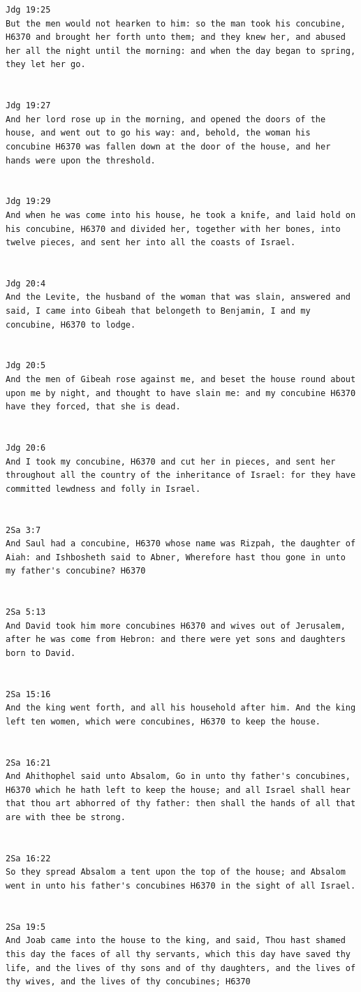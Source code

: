 \documentclass[11pt]{article}
\begin{document}
\begin{lstlisting}
Jdg 19:25
But the men would not hearken to him: so the man took his concubine, H6370 and brought her forth unto them; and they knew her, and abused her all the night until the morning: and when the day began to spring, they let her go.


Jdg 19:27
And her lord rose up in the morning, and opened the doors of the house, and went out to go his way: and, behold, the woman his concubine H6370 was fallen down at the door of the house, and her hands were upon the threshold.


Jdg 19:29
And when he was come into his house, he took a knife, and laid hold on his concubine, H6370 and divided her, together with her bones, into twelve pieces, and sent her into all the coasts of Israel.


Jdg 20:4
And the Levite, the husband of the woman that was slain, answered and said, I came into Gibeah that belongeth to Benjamin, I and my concubine, H6370 to lodge.


Jdg 20:5
And the men of Gibeah rose against me, and beset the house round about upon me by night, and thought to have slain me: and my concubine H6370 have they forced, that she is dead.


Jdg 20:6
And I took my concubine, H6370 and cut her in pieces, and sent her throughout all the country of the inheritance of Israel: for they have committed lewdness and folly in Israel.


2Sa 3:7
And Saul had a concubine, H6370 whose name was Rizpah, the daughter of Aiah: and Ishbosheth said to Abner, Wherefore hast thou gone in unto my father's concubine? H6370


2Sa 5:13
And David took him more concubines H6370 and wives out of Jerusalem, after he was come from Hebron: and there were yet sons and daughters born to David.


2Sa 15:16
And the king went forth, and all his household after him. And the king left ten women, which were concubines, H6370 to keep the house.


2Sa 16:21
And Ahithophel said unto Absalom, Go in unto thy father's concubines, H6370 which he hath left to keep the house; and all Israel shall hear that thou art abhorred of thy father: then shall the hands of all that are with thee be strong.


2Sa 16:22
So they spread Absalom a tent upon the top of the house; and Absalom went in unto his father's concubines H6370 in the sight of all Israel.


2Sa 19:5
And Joab came into the house to the king, and said, Thou hast shamed this day the faces of all thy servants, which this day have saved thy life, and the lives of thy sons and of thy daughters, and the lives of thy wives, and the lives of thy concubines; H6370



\end{lstlisting}
\end{document}

